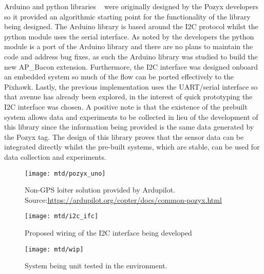 Arduino and python libraries ~\citep{pozarduino} were originally designed by the Pozyx developers so it provided an algorithmic starting point for the functionality of the library being designed.
The Arduino library is based around the I2C protocol whilst the python module uses the serial interface.
As noted by the developers the python module is a port of the Arduino library and there are no plans to maintain the code and address bug fixes, as such the Arduino library was studied to build the new AP\_Bacon extension.
Furthermore, the I2C interface was designed onboard an embedded system so much of the flow can be ported effectively to the Pixhawk.
Lastly, the previous implementation uses the UART/serial interface so that avenue has already been explored, in the interest of quick prototyping the I2C interface was chosen.
A positive note is that the existence of the prebuilt system allows data and experiments to be collected in lieu of the development of this library since the information being provided is the same data generated by the Pozyx tag.
The design of this library proves that the sensor data can be integrated directly whilst the pre-built systems, which are stable, can be used for data collection and experiments.
%


\begin{figure}[ht!]
    \centering
    \texttt{[image: mtd/pozyx\_uno]}
    \caption{Non-GPS loiter solution provided by Ardupilot.
    Source:\url{https://ardupilot.org/copter/docs/common-pozyx.html}}
\end{figure}

\begin{figure}[ht!]
    \centering
    \texttt{[image: mtd/i2c\_ifc]}
    \caption{Proposed wiring of the I2C interface being developed}
\end{figure}

\begin{figure}[ht!]
    \centering
    \texttt{[image: mtd/wip]}
    \caption{System being unit tested in the environment.}
\end{figure}
\newpage

